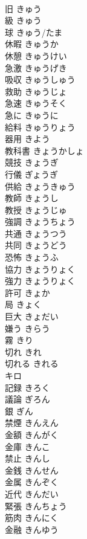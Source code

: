 \documentclass[8pt]{extreport}
\begin{document}
\begin{CJK}{UTF8}{min}
\\	旧	きゅう	
\\	級	きゅう	
\\	球	きゅう/たま	
\\	休暇	きゅうか	
\\	休憩	きゅうけい	
\\	急激	きゅうげき	
\\	吸収	きゅうしゅう	
\\	救助	きゅうじょ	
\\	急速	きゅうそく	
\\	急に	きゅうに	
\\	給料	きゅうりょう	
\\	器用	きよう	
\\	教科書	きょうかしょ	
\\	競技	きょうぎ	
\\	行儀	ぎょうぎ	
\\	供給	きょうきゅう	
\\	教師	きょうし	
\\	教授	きょうじゅ	
\\	強調	きょうちょう	
\\	共通	きょうつう	
\\	共同	きょうどう	
\\	恐怖	きょうふ	
\\	協力	きょうりょく	
\\	強力	きょうりょく	
\\	許可	きょか	
\\	局	きょく	
\\	巨大	きょだい	
\\	嫌う	きらう	
\\	霧	きり	
\\	切れ	きれ	
\\	切れる	きれる	
\\	キロ		
\\	記録	きろく	
\\	議論	ぎろん	
\\	銀	ぎん	
\\	禁煙	きんえん	
\\	金額	きんがく	
\\	金庫	きんこ	
\\	禁止	きんし	
\\	金銭	きんせん	
\\	金属	きんぞく	
\\	近代	きんだい	
\\	緊張	きんちょう	
\\	筋肉	きんにく	
\\	金融	きんゆう	

\end{CJK}
\end{document}
